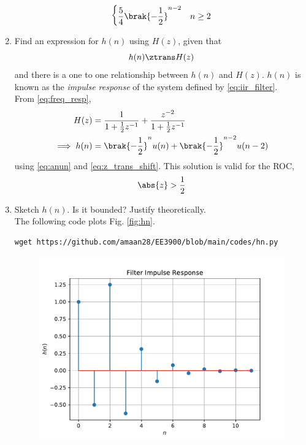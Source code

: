 \documentclass[journal,12pt,twocolumn]{IEEEtran}
\renewcommand\thesection{\arabic{section}}
\begin{document}
\begin{enumerate}[label=\thesection.\arabic*]
\begin{align}
\begin{cases}
			\dfrac{5}{4} \brak{-\dfrac12}^{n-2} & n \ge 2
		\end{cases}
	\end{align}
	\item \label{prob:impulse_resp}
	Find an expression for $h(n)$ using $H(z)$, given that 
	\begin{equation}
		\label{eq:impulse_resp}
		h(n) \ztrans H(z)
	\end{equation}
	and there is a one to one relationship between $h(n)$ and $H(z)$. $h(n)$ is known as the {\em impulse response} of the
	system defined by \eqref{eq:iir_filter}.
	\\
	\solution From \eqref{eq:freq_resp},
	\begin{align}
		H(z) &= \frac{1}{1 + \frac{1}{2}z^{-1}} + \frac{ z^{-2}}{1 + \frac{1}{2}z^{-1}}
\\
		\implies h(n) &= \brak{-\frac{1}{2}}^{n}u(n) + \brak{-\frac{1}{2}}^{n-2}u(n-2)
	\end{align}
	using \eqref{eq:anun} and \eqref{eq:z_trans_shift}.
	\newline This solution is valid for the ROC,
	\begin{align}
		\abs{z}>\frac{1}{2}
	\end{align} 
	\item Sketch $h(n)$. Is it bounded? Justify theoretically.
	\\
	\solution 
	The following code plots Fig. \ref{fig:hn}.
	\begin{lstlisting}
wget https://github.com/amaan28/EE3900/blob/main/codes/hn.py
	\end{lstlisting}
	\begin{figure}[!ht]
		\centering
		\includegraphics[width=\columnwidth]{./figs/hn}

\end{figure}
\end{enumerate}
\end{document}
